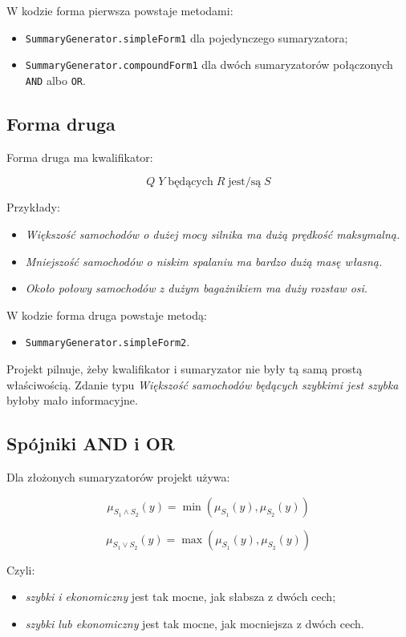 \documentclass[11pt,a4paper]{article}
\newcommand{\code}[1]{\texttt{#1}}
\begin{document}
W kodzie forma pierwsza powstaje metodami:

\begin{itemize}
    \item \code{SummaryGenerator.simpleForm1} dla pojedynczego sumaryzatora;
    \item \code{SummaryGenerator.compoundForm1} dla dwóch sumaryzatorów połączonych \code{AND} albo \code{OR}.
\end{itemize}

\subsection{Forma druga}

Forma druga ma kwalifikator:

\[
Q\;Y\;\text{będących}\;R\;\text{jest/są}\;S
\]

Przykłady:

\begin{itemize}
    \item \emph{Większość samochodów o dużej mocy silnika ma dużą prędkość maksymalną.}
    \item \emph{Mniejszość samochodów o niskim spalaniu ma bardzo dużą masę własną.}
    \item \emph{Około połowy samochodów z dużym bagażnikiem ma duży rozstaw osi.}
\end{itemize}

W kodzie forma druga powstaje metodą:

\begin{itemize}
    \item \code{SummaryGenerator.simpleForm2}.
\end{itemize}

Projekt pilnuje, żeby kwalifikator i sumaryzator nie były tą samą prostą właściwością. Zdanie typu \emph{Większość samochodów będących szybkimi jest szybka} byłoby mało informacyjne.

\subsection{Spójniki AND i OR}

Dla złożonych sumaryzatorów projekt używa:

\[
\mu_{S_1 \land S_2}(y)=\min(\mu_{S_1}(y), \mu_{S_2}(y))
\]

\[
\mu_{S_1 \lor S_2}(y)=\max(\mu_{S_1}(y), \mu_{S_2}(y))
\]

Czyli:

\begin{itemize}
    \item \emph{szybki i ekonomiczny} jest tak mocne, jak słabsza z dwóch cech;
    \item \emph{szybki lub ekonomiczny} jest tak mocne, jak mocniejsza z dwóch cech.
\end{itemize}
\end{document}
